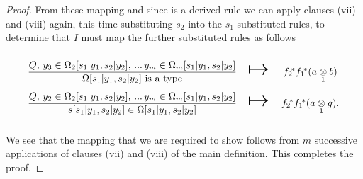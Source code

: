 {\begin{proof}
From these mapping and since  \stworule is a derived rule we can  apply clauses (vii) and (viii) again,
this time substituting $s_2$ into the $s_1$ substituted rules, to determine that $I$ must map the further substituted rules as follows
\begin{equation*}
\begin{array}{c c c}
\forceSOURCEwidth & & \forceTARGETwidth \\ [-0.1cm]
\weakenedOmegaruleSecondsubstitution  & \Imapsto & \ftwostar \fonestar(\crossx{a}{b}{1})   \\ [0.4cm]
\weakenedsruleSecondsubstitution      & \Imapsto & \ftwostar \fonestar(\crossx{a}{g}{1}).
\end{array}
\end{equation*}

We see that the mapping that we are required to show follows from $m$ successive applications of clauses (vii) and (viii) of the main definition.
This completes the proof.


\end{proof}}
